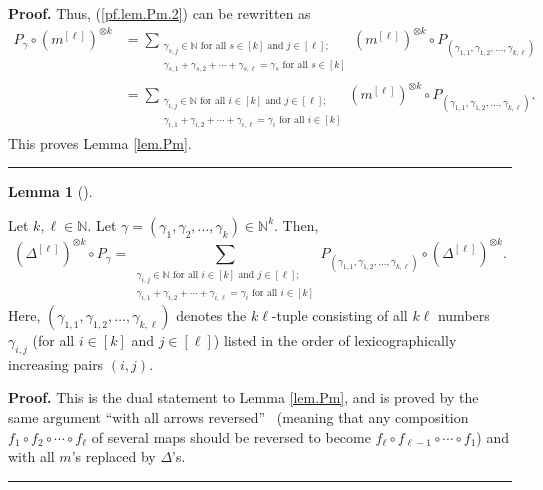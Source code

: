 \documentclass[numbers=enddot,12pt,final,onecolumn,notitlepage]{scrartcl}%
\theoremstyle{definition}
\newtheorem{lem}[theo]{Lemma}
\newenvironment{lemma}[1][]
{\begin{lem}[#1]\begin{leftbar}}
{\end{leftbar}\end{lem}}
\newenvironment{proof}[1][Proof]{\noindent\textbf{#1.} }{\ \rule{0.5em}{0.5em}}
\let\sumnonlimits\sum
\renewcommand{\sum}{\sumnonlimits\limits}
\begin{document}
\begin{proof}
Thus, (\ref{pf.lem.Pm.2}) can be rewritten as%
\begin{align*}
P_{\gamma}\circ\left(  m^{\left[  \ell\right]  }\right)  ^{\otimes k}  &
=\sum_{\substack{\gamma_{s,j}\in\mathbb{N}\text{ for all }s\in\left[
k\right]  \text{ and }j\in\left[  \ell\right]  ;\\\gamma_{s,1}+\gamma
_{s,2}+\cdots+\gamma_{s,\ell}=\gamma_{s}\text{ for all }s\in\left[  k\right]
}}\left(  m^{\left[  \ell\right]  }\right)  ^{\otimes k}\circ P_{\left(
\gamma_{1,1},\gamma_{1,2},\ldots,\gamma_{k,\ell}\right)  }\\
&  =\sum_{\substack{\gamma_{i,j}\in\mathbb{N}\text{ for all }i\in\left[
k\right]  \text{ and }j\in\left[  \ell\right]  ;\\\gamma_{i,1}+\gamma
_{i,2}+\cdots+\gamma_{i,\ell}=\gamma_{i}\text{ for all }i\in\left[  k\right]
}}\left(  m^{\left[  \ell\right]  }\right)  ^{\otimes k}\circ P_{\left(
\gamma_{1,1},\gamma_{1,2},\ldots,\gamma_{k,\ell}\right)  }.
\end{align*}
This proves Lemma \ref{lem.Pm}.
\end{proof}

\begin{lemma}
\label{lem.DelP}Let $k,\ell\in\mathbb{N}$. Let $\gamma=\left(  \gamma
_{1},\gamma_{2},\ldots,\gamma_{k}\right)  \in\mathbb{N}^{k}$. Then,%
\begin{equation}
\left(  \Delta^{\left[  \ell\right]  }\right)  ^{\otimes k}\circ P_{\gamma
}=\sum_{\substack{\gamma_{i,j}\in\mathbb{N}\text{ for all }i\in\left[
k\right]  \text{ and }j\in\left[  \ell\right]  ;\\\gamma_{i,1}+\gamma
_{i,2}+\cdots+\gamma_{i,\ell}=\gamma_{i}\text{ for all }i\in\left[  k\right]
}}P_{\left(  \gamma_{1,1},\gamma_{1,2},\ldots,\gamma_{k,\ell}\right)  }%
\circ\left(  \Delta^{\left[  \ell\right]  }\right)  ^{\otimes k}.\nonumber
\end{equation}
Here, $\left(  \gamma_{1,1},\gamma_{1,2},\ldots,\gamma_{k,\ell}\right)  $
denotes the $k\ell$-tuple consisting of all $k\ell$ numbers $\gamma_{i,j}$
(for all $i\in\left[  k\right]  $ and $j\in\left[  \ell\right]  $) listed in
the order of lexicographically increasing pairs $\left(  i,j\right)  $.
\end{lemma}

\begin{proof}
This is the dual statement to Lemma \ref{lem.Pm}, and is proved by the same
argument \textquotedblleft with all arrows reversed\textquotedblright%
\ (meaning that any composition $f_{1}\circ f_{2}\circ\cdots\circ f_{\ell}$ of
several maps should be reversed to become $f_{\ell}\circ f_{\ell-1}\circ
\cdots\circ f_{1}$) and with all $m$'s replaced by $\Delta$'s.
\end{proof}
\end{document}
